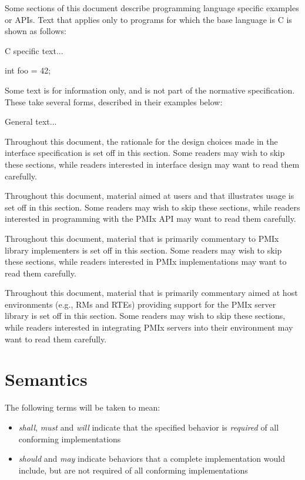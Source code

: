 Some sections of this document describe programming language specific examples or \acp{API}.
Text that applies only to programs for which the base language is C is shown as follows:

\cspecificstart
C specific text...
\begin{codepar}
int foo = 42;
\end{codepar}
\cspecificend

Some text is for information only, and is not part of the normative specification.
These take several forms, described in their examples below:

\notestart
\noteheader
General text...
\noteend

\rationalestart
Throughout this document, the rationale for the design choices made in the interface specification is set off in this section.
Some readers may wish to skip these sections, while readers interested in interface design may want to read them carefully.
\rationaleend

\adviceuserstart
Throughout this document, material aimed at users and that illustrates usage is set off in this section.
Some readers may wish to skip these sections, while readers interested in programming with the \ac{PMIx} \ac{API} may want to read them carefully.
\adviceuserend

\adviceimplstart
Throughout this document, material that is primarily commentary to \ac{PMIx} library implementers is set off in this section.
Some readers may wish to skip these sections, while readers interested in \ac{PMIx} implementations may want to read them carefully.
\adviceimplend

\advicermstart
Throughout this document, material that is primarily commentary aimed at host environments (e.g., \acp{RM} and \acp{RTE}) providing support for the \ac{PMIx} server library is set off in this section.
Some readers may wish to skip these sections, while readers interested in integrating \ac{PMIx} servers into their environment may want to read them carefully.
\advicermend

\section{Semantics}

The following terms will be taken to mean:

\begin{itemize}
\item \emph{shall}, \emph{must} and \emph{will} indicate that the specified behavior is \emph{required} of all conforming implementations
\item \emph{should} and \emph{may} indicate behaviors that a complete implementation would include, but are not required of all conforming implementations
\end{itemize}

